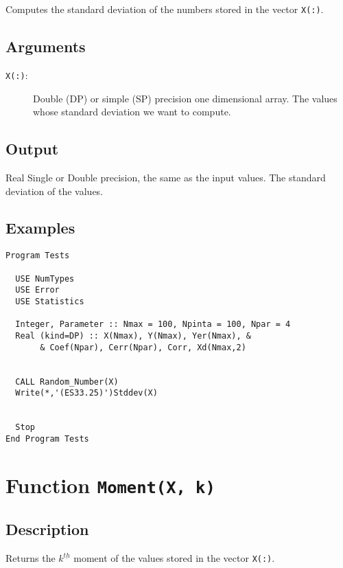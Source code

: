 Computes the standard deviation of the numbers stored in the vector
\texttt{X(:)}. 

\subsection{Arguments}

\begin{description}
\item[\texttt{X(:)}:] Double (DP) or simple (SP) precision one
  dimensional array. The values  whose standard deviation we want to
  compute. 
\end{description}

\subsection{Output}

Real Single or Double precision, the same as the input values. The
standard deviation of the values.

\subsection{Examples}

\begin{lstlisting}[emph=Stddev,
                   emphstyle=\color{blue},
                   frame=trBL,
                   caption=Compputing the standard deviation.,
                   label=stddev]
Program Tests

  USE NumTypes
  USE Error
  USE Statistics

  Integer, Parameter :: Nmax = 100, Npinta = 100, Npar = 4
  Real (kind=DP) :: X(Nmax), Y(Nmax), Yer(Nmax), &
       & Coef(Npar), Cerr(Npar), Corr, Xd(Nmax,2)


  CALL Random_Number(X)
  Write(*,'(ES33.25)')Stddev(X)


  Stop
End Program Tests
\end{lstlisting}

\section{Function \texttt{Moment(X, k)}}

\subsection{Description}

Returns the $k^{\underline{th}}$ moment of the values stored in the
vector \texttt{X(:)}.

